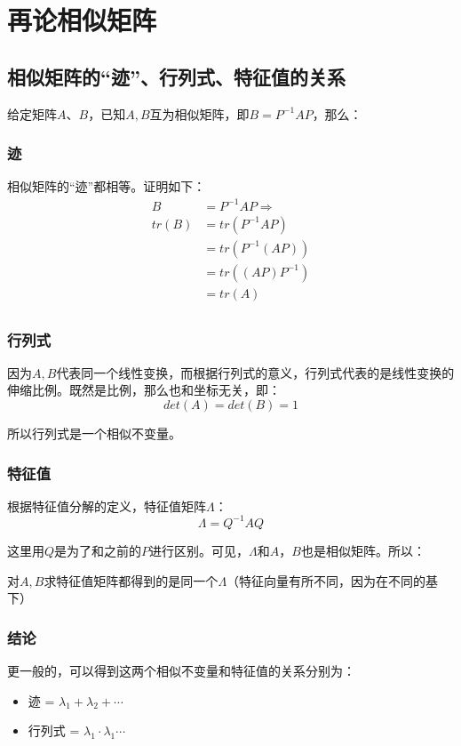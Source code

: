 \documentclass[12pt]{article}
\begin{document}
\section{再论相似矩阵}
\subsection{相似矩阵的“迹”、行列式、特征值的关系}
给定矩阵$A$、$B$，已知$A,B$互为相似矩阵，即$B = P^{-1}AP$，那么：

\subsubsection{迹}
相似矩阵的“迹”都相等。证明如下：
\begin{align*}
    B &= P^{-1}AP \Rightarrow \\
    tr(B) &= tr(P^{-1}AP) \\
          &= tr(P^{-1}(AP)) \\
          &= tr((AP)P^{-1}) \\
          &= tr(A) \\   
\end{align*}

\subsubsection{行列式}
因为$A,B$代表同一个线性变换，而根据行列式的意义，行列式代表的是线性变换的伸缩比例。既然是比例，那么也和坐标无关，即：
$$
det(A) = det(B) = 1
$$

所以行列式是一个相似不变量。

\subsubsection{特征值}
根据特征值分解的定义，特征值矩阵$\Lambda$：
$$
\Lambda = Q^{-1}AQ
$$

这里用$Q$是为了和之前的$P$进行区别。可见，$\Lambda$和$A$，$B$也是相似矩阵。所以：

对$A,B$求特征值矩阵都得到的是同一个$\Lambda$（特征向量有所不同，因为在不同的基下）

\subsubsection{结论}
更一般的，可以得到这两个相似不变量和特征值的关系分别为：
\begin{itemize}
    \item 迹 = $\lambda_1 + \lambda_2 + \cdots$
    \item 行列式 = $\lambda_1\cdot\lambda_1\cdots$
\end{itemize}
\end{document}
